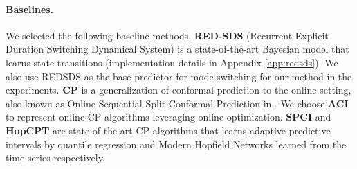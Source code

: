 \paragraph{Baselines.} We selected the following baseline methods. \textbf{RED-SDS} (Recurrent Explicit Duration Switching Dynamical System) \cite{ansari2021deep} is a state-of-the-art Bayesian model that learns state transitions (implementation details in Appendix \ref{app:redsds}). We also use REDSDS as the base predictor for mode switching for our method in the experiments. \textbf{CP} is a generalization of conformal prediction to the online setting, also known as Online Sequential Split Conformal Prediction in \cite{zaffran2022adaptive}. We choose \textbf{ACI} \citep{gibbs2021adaptive} to represent online CP algorithms leveraging online optimization. \textbf{SPCI} \citep{xu2023sequential} and \textbf{HopCPT} \cite{auer2023hopcpt} are state-of-the-art CP algorithms that learns adaptive predictive intervals by quantile regression and Modern Hopfield Networks learned from the time series respectively. 
\vspace{-0.5em}
